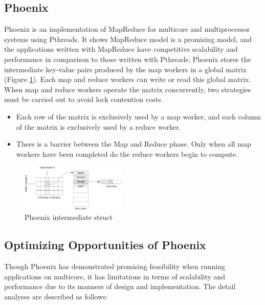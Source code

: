 \subsection{Phoenix}
Phoenix is an implementation of MapReduce for multicore  and multiprocessor systems using Pthreads.
It shows MapReduce model is a promising model, and the applications written with MapReduce have competitive scalability and performance in comparison to those written with Pthreads\cite{ranger2007phoenix};
Phoenix stores the intermediate key-value pairs produced 
by the map workers in a global matrix (Figure \ref{fig:phoenix:intermediate}). 
Each map and reduce workers can write or read this global matrix. 
When map and reduce workers operate the matrix concurrently,
two strategies must be carried out to avoid lock contention costs.
\begin{itemize}
	\item Each row of the matrix is exclusively used by a map worker, and each column of the matrix is exclusively used by a reduce worker. 
	\item There is a barrier between the Map and Reduce phase. Only when all map workers have been completed do the reduce workers begin to compute. 
\end{itemize}

\begin{figure}[!h!t]  
    \centering
    \includegraphics[width=0.45\textwidth]{eps/phoenix_intermediate.eps}
    \caption{Phoenix intermediate struct}
    \label{fig:phoenix:intermediate}
\end{figure}

\subsection{Optimizing Opportunities of Phoenix}
Though Phoenix has demonstrated promising feasibility when running  applications on multicore, it has limitations in terms of scalability and performance due to its manners of design and implementation.
The detail analyses are described as follows:

